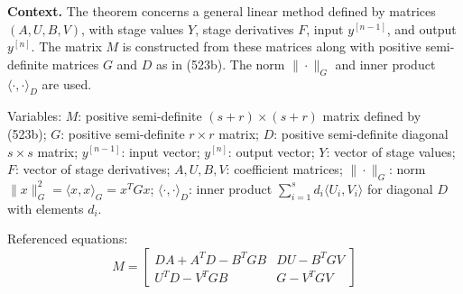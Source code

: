 \noindent\textbf{Context.} The theorem concerns a general linear method defined by matrices $(A, U, B, V)$, with stage values $Y$, stage derivatives $F$, input $y^{[n-1]}$, and output $y^{[n]}$. The matrix $M$ is constructed from these matrices along with positive semi-definite matrices $G$ and $D$ as in (523b). The norm $\|\cdot\|_G$ and inner product $\langle\cdot,\cdot\rangle_D$ are used.

Variables: $M$: positive semi-definite $(s + r) \times (s + r)$ matrix defined by (523b); $G$: positive semi-definite $r \times r$ matrix; $D$: positive semi-definite diagonal $s \times s$ matrix; $y^{[n-1]}$: input vector; $y^{[n]}$: output vector; $Y$: vector of stage values; $F$: vector of stage derivatives; $A, U, B, V$: coefficient matrices; $\|\cdot\|_G$: norm $\|x\|_G^2 = \langle x, x\rangle_G = x^T G x$; $\langle\cdot,\cdot\rangle_D$: inner product $\sum_{i=1}^s d_i \langle U_i, V_i\rangle$ for diagonal $D$ with elements $d_i$.

Referenced equations:
\begin{equation}
M = \begin{bmatrix}
D A + A^T D - B^T G B & D U - B^T G V \\
U^T D - V^T G B & G - V^T G V
\end{bmatrix}
\tag{523b}
\end{equation}


